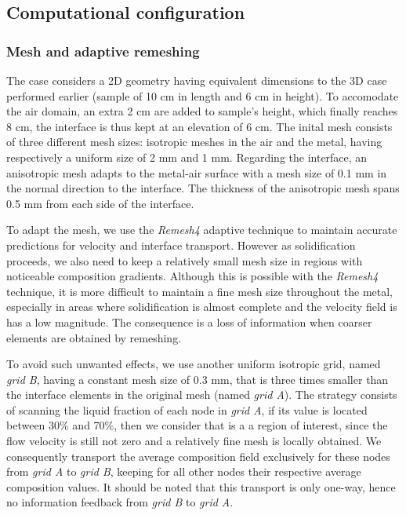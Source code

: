 \subsection{Computational configuration}


\subsubsection{Mesh and adaptive remeshing}
The case considers a 2D geometry having equivalent dimensions to the 3D case performed earlier (sample of 10 cm in length and 6 cm in height).
To accomodate the air domain, an extra 2 cm are added to sample's height, which finally reaches 8 cm, the interface is thus kept at an elevation of 6 cm. 
The inital mesh consists of three different mesh sizes: isotropic meshes in the air and the metal, having respectively a uniform size of 2 mm and 1 mm.
Regarding the interface, an anisotropic mesh adapts to the metal-air surface with a mesh size of 0.1 mm in the normal direction to the interface.
The thickness of the anisotropic mesh spans 0.5 mm from each side of the interface.

To adapt the mesh, we use the \emph{Remesh4} adaptive technique to maintain accurate predictions for velocity and interface transport.
However as solidification proceeds, we also need to keep a relatively small mesh size in regions with noticeable composition gradients.
Although this is possible with the \emph{Remesh4} technique, it is more difficult to maintain a fine mesh size throughout the metal, especially in areas
where solidification is almost complete and the velocity field is has a low magnitude. The consequence is a loss of information when coarser 
elements are obtained by remeshing.

To avoid such unwanted effects, we use another uniform
isotropic grid, named \emph{grid B}, having a constant mesh size of 0.3 mm, that is three times smaller than the interface elements in the original mesh (named \emph{grid A}).
The strategy consists of scanning the liquid fraction of each node in \emph{grid A}, if its value is located between 30\% and 70\%, then we consider that is a 
a region of interest, since the flow velocity is still not zero and a relatively fine mesh is locally obtained. 
We consequently transport the average composition field exclusively 
for these nodes from \emph{grid A} to \emph{grid B}, keeping for all other nodes their respective average composition values.
It should be noted that this transport is only one-way, hence no information feedback from \emph{grid B} to \emph{grid A}.

